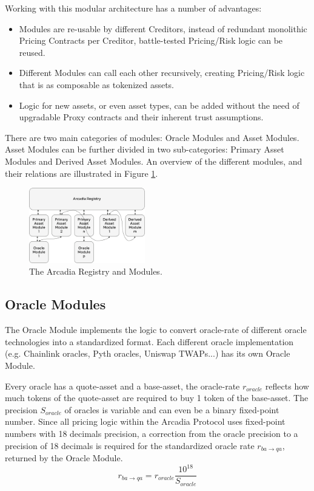\documentclass[sigconf,nonacm]{acmart}
\begin{document}
Working with this modular architecture has a number of advantages:
\begin{itemize}
    \item Modules are re-usable by different Creditors, instead of redundant monolithic Pricing Contracts per Creditor, battle-tested Pricing/Risk logic can be reused.
    \item Different Modules can call each other recursively, creating Pricing/Risk logic that is as composable as tokenized assets.
    \item Logic for new assets, or even asset types, can be added without the need of upgradable Proxy contracts and their inherent trust assumptions.
\end{itemize}

There are two main categories of modules: Oracle Modules and Asset Modules.
Asset Modules can be further divided in two sub-categories: Primary Asset Modules and Derived Asset Modules.
An overview of the different modules, and their relations are illustrated in Figure \ref{fig:arcadia-registry}.

\begin{figure}
    \centering
    \includegraphics[width=0.45\textwidth]{images/Arcadia-Registry.png}
    \caption{The Arcadia Registry and Modules. \label{fig:arcadia-registry}}
\end{figure}

\subsection{Oracle Modules}
The Oracle Module implements the logic to convert oracle-rate of different oracle technologies into a standardized format.
Each different oracle implementation (e.g. Chainlink oracles, Pyth oracles, Uniswap TWAPs...) has its own Oracle Module.

Every oracle has a quote-asset and a base-asset, the oracle-rate $r_{oracle}$ reflects how much tokens of the quote-asset are required to buy 1 token of the base-asset.
The precision $S_{oracle}$ of oracles is variable and can even be a binary fixed-point number.
Since all pricing logic within the Arcadia Protocol uses fixed-point numbers with 18 decimals precision,
a correction from the oracle precision to a precision of 18 decimals is required for the standardized oracle rate $r_{ba\rightarrow qa}$, returned by the Oracle Module.
\begin{equation}
    \label{eq:oracle-module}
    r_{ba\rightarrow qa} = r_{oracle} \frac{10^{18}}{S_{oracle}}
\end{equation}
\end{document}
